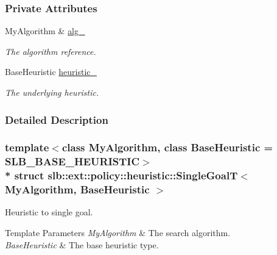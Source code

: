 \subsubsection*{Private Attributes}
\begin{DoxyCompactItemize}
\item 
My\+Algorithm \& \hyperlink{structslb_1_1ext_1_1policy_1_1heuristic_1_1SingleGoalT_aa1e432ef97a4c24c0d08fd1a1222de46}{alg\+\_\+}\hypertarget{structslb_1_1ext_1_1policy_1_1heuristic_1_1SingleGoalT_aa1e432ef97a4c24c0d08fd1a1222de46}{}\label{structslb_1_1ext_1_1policy_1_1heuristic_1_1SingleGoalT_aa1e432ef97a4c24c0d08fd1a1222de46}

\begin{DoxyCompactList}\small\item\em The algorithm reference. \end{DoxyCompactList}\item 
Base\+Heuristic \hyperlink{structslb_1_1ext_1_1policy_1_1heuristic_1_1SingleGoalT_af3b0b53ca4222a01d90fb3aa1c152df0}{heuristic\+\_\+}\hypertarget{structslb_1_1ext_1_1policy_1_1heuristic_1_1SingleGoalT_af3b0b53ca4222a01d90fb3aa1c152df0}{}\label{structslb_1_1ext_1_1policy_1_1heuristic_1_1SingleGoalT_af3b0b53ca4222a01d90fb3aa1c152df0}

\begin{DoxyCompactList}\small\item\em The underlying heuristic. \end{DoxyCompactList}\end{DoxyCompactItemize}


\subsubsection{Detailed Description}
\subsubsection*{template$<$class My\+Algorithm, class Base\+Heuristic = S\+L\+B\+\_\+\+B\+A\+S\+E\+\_\+\+H\+E\+U\+R\+I\+S\+T\+IC$>$\\*
struct slb\+::ext\+::policy\+::heuristic\+::\+Single\+Goal\+T$<$ My\+Algorithm, Base\+Heuristic $>$}

Heuristic to single goal. 


\begin{DoxyTemplParams}{Template Parameters}
{\em My\+Algorithm} & The search algorithm. \\
\hline
{\em Base\+Heuristic} & The base heuristic type. \\
\hline
\end{DoxyTemplParams}



